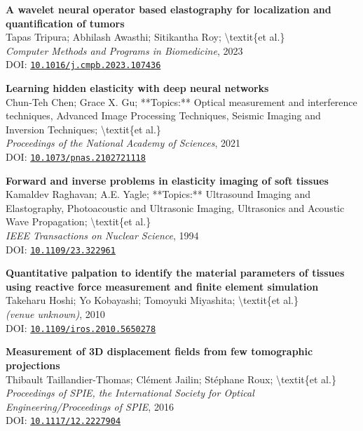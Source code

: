\documentclass[11pt,a4paper]{article}
\begin{document}
\begin{enumerate}[leftmargin=*, label=\textbf{[\arabic*]}, itemsep=10pt]
\item 
\textbf{A wavelet neural operator based elastography for localization and quantification of tumors}
\\
Tapas Tripura; Abhilash Awasthi; Sitikantha Roy; \textbackslash{}textit\{et al.\}
\\
\textit{Computer Methods and Programs in Biomedicine}, 2023
\\
DOI: \href{https://doi.org/10.1016/j.cmpb.2023.107436}{\texttt{10.1016/j.cmpb.2023.107436}}

\item 
\textbf{Learning hidden elasticity with deep neural networks}
\\
Chun‐Teh Chen; Grace X. Gu; **Topics:** Optical measurement and interference techniques, Advanced Image Processing Techniques, Seismic Imaging and Inversion Techniques; \textbackslash{}textit\{et al.\}
\\
\textit{Proceedings of the National Academy of Sciences}, 2021
\\
DOI: \href{https://doi.org/10.1073/pnas.2102721118}{\texttt{10.1073/pnas.2102721118}}

\item 
\textbf{Forward and inverse problems in elasticity imaging of soft tissues}
\\
Kamaldev Raghavan; A.E. Yagle; **Topics:** Ultrasound Imaging and Elastography, Photoacoustic and Ultrasonic Imaging, Ultrasonics and Acoustic Wave Propagation; \textbackslash{}textit\{et al.\}
\\
\textit{IEEE Transactions on Nuclear Science}, 1994
\\
DOI: \href{https://doi.org/10.1109/23.322961}{\texttt{10.1109/23.322961}}

\item 
\textbf{Quantitative palpation to identify the material parameters of tissues using reactive force measurement and finite element simulation}
\\
Takeharu Hoshi; Yo Kobayashi; Tomoyuki Miyashita; \textbackslash{}textit\{et al.\}
\\
\textit{\textit{(venue unknown)}}, 2010
\\
DOI: \href{https://doi.org/10.1109/iros.2010.5650278}{\texttt{10.1109/iros.2010.5650278}}

\item 
\textbf{Measurement of 3D displacement fields from few tomographic projections}
\\
Thibault Taillandier-Thomas; Clément Jailin; Stéphane Roux; \textbackslash{}textit\{et al.\}
\\
\textit{Proceedings of SPIE, the International Society for Optical Engineering/Proceedings of SPIE}, 2016
\\
DOI: \href{https://doi.org/10.1117/12.2227904}{\texttt{10.1117/12.2227904}}


\end{enumerate}
\end{document}
